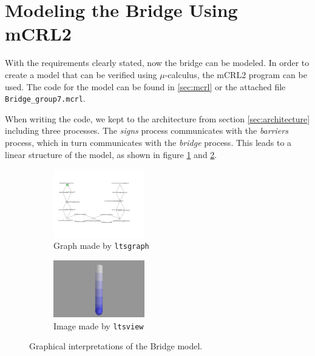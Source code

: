 \section{Modeling the Bridge Using mCRL2}

With the requirements clearly stated, now the bridge can be modeled. In order to create a model that can be verified using $\mu$-calculus, the mCRL2 program can be used. The code for the model can be found in \ref{sec:mcrl} or the attached file \texttt{Bridge\_group7.mcrl}.

When writing the code, we kept to the architecture from section \ref{sec:architecture} including three processes. The \emph{signs} process communicates with the \emph{barriers} process, which in turn communicates with the \emph{bridge} process. This leads to a linear structure of the model, as shown in figure \ref{fig:graph} and \ref{fig:view}.
%
\begin{figure}[htb]
\centering
		\begin{subfigure} [h] {0.3\textwidth}
		\centering
		\includegraphics[width=150px]{Images/Bridge_ltsgraph.png}
		\caption{Graph made by \texttt{ltsgraph}}
		\label{fig:graph}
	\end{subfigure}
\hspace{5em}
	\begin{subfigure} [h] {0.3\textwidth}
		\centering
		\includegraphics[width=150px]{Images/Bridge_ltsview.jpg}
		\caption{Image made by \texttt{ltsview}}
		\label{fig:view}
	\end{subfigure}
\caption{Graphical interpretations of the Bridge model.}%
\label{}%
\end{figure}%
%